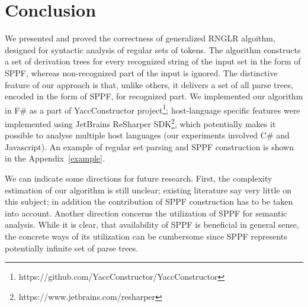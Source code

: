 \section{Conclusion}
%

We presented and proved the correctness of generalized RNGLR algoithm, designed for syntactic analysis of regular sets of
tokens. The algorithm constructs a set of derivation trees for every recognized string of the input set in the form of SPPF, 
whereas non-recognized part of the input is ignored. The distinctive feature of our approach is that, unlike others, it 
delivers a set of all parse trees, encoded in the form of SPPF, for recognized part. We implemented our algorithm in F\# as a part of YaccConstructor 
project\footnote{https://github.com/YaccConstructor/YaccConstructor}; host-language specific features were implemented
using JetBrains ReSharper SDK\footnote{https://www.jetbrains.com/resharper}, which potentially makes it possible to
analyse multiple host languages (our experiments involved C\# and Javascript). An example of regular set parsing and
SPPF construction is shown in the Appendix~\ref{example}.

We can indicate some directions for future research. First, the complexity estimation of our algorithm is still unclear; existing
literature say very little on this subject; in addition the contribution of SPPF construction has to be taken into account. 
Another direction concerns the utilization of SPPF for semantic analysis. While it is clear, that availability of SPPF 
is beneficial in general sense, the concrete ways of its utilization can be cumbersome since SPPF represents 
potentially infinite set of parse trees. 

